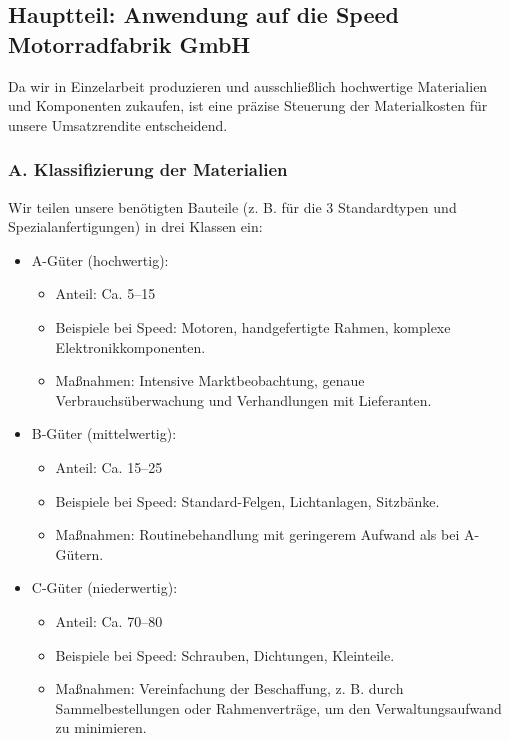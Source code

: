 \documentclass[12pt, a4paper]{article}
\begin{document}
\subsection{Hauptteil: Anwendung auf die Speed Motorradfabrik GmbH}
Da wir in Einzelarbeit produzieren und ausschließlich hochwertige Materialien und Komponenten zukaufen, ist eine präzise Steuerung der Materialkosten für unsere Umsatzrendite entscheidend.
\subsubsection{A. Klassifizierung der Materialien}
Wir teilen unsere benötigten Bauteile (z. B. für die 3 Standardtypen und Spezialanfertigungen) in drei Klassen ein:
\begin{itemize}
    \item A-Güter (hochwertig):
        \begin{itemize}
            \item Anteil: Ca. 5–15 %
            \item Beispiele bei Speed: Motoren, handgefertigte Rahmen, komplexe Elektronikkomponenten.
            \item Maßnahmen: Intensive Marktbeobachtung, genaue Verbrauchsüberwachung und Verhandlungen mit Lieferanten.
        \end{itemize}
    \item B-Güter (mittelwertig):
        \begin{itemize}
            \item Anteil: Ca. 15–25 %
            \item Beispiele bei Speed: Standard-Felgen, Lichtanlagen, Sitzbänke.
            \item Maßnahmen: Routinebehandlung mit geringerem Aufwand als bei A-Gütern.
        \end{itemize}     
    \item C-Güter (niederwertig):
        \begin{itemize}
            \item Anteil: Ca. 70–80 %
            \item Beispiele bei Speed: Schrauben, Dichtungen, Kleinteile.
            \item Maßnahmen: Vereinfachung der Beschaffung, z. B. durch Sammelbestellungen oder Rahmenverträge, um den Verwaltungsaufwand zu minimieren.
        \end{itemize}        
\end{itemize}
    
\end{document}
